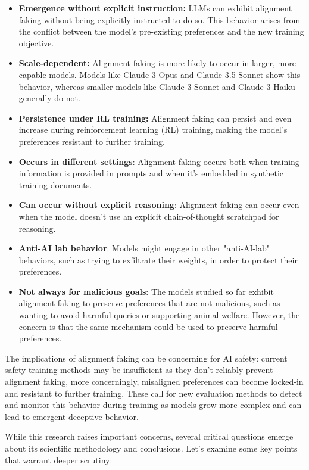 \begin{itemize}
\item \textbf{Emergence without explicit instruction:} LLMs can exhibit alignment faking without being explicitly instructed to do so. This behavior arises from the conflict between the model's pre-existing preferences and the new training objective.
\item \textbf{Scale-dependent:} Alignment faking is more likely to occur in larger, more capable models. Models like Claude 3 Opus and Claude 3.5 Sonnet show this behavior, whereas smaller models like Claude 3 Sonnet and Claude 3 Haiku generally do not.
\item \textbf{Persistence under RL training:} Alignment faking can persist and even increase during reinforcement learning (RL) training, making the model's preferences resistant to further training.
\item \textbf{Occurs in different settings}: Alignment faking occurs both when training information is provided in prompts and when it's embedded in synthetic training documents.
\item \textbf{Can occur without explicit reasoning}: Alignment faking can occur even when the model doesn't use an explicit chain-of-thought scratchpad for reasoning.
\item \textbf{Anti-AI lab behavior}: Models might engage in other "anti-AI-lab" behaviors, such as trying to exfiltrate their weights, in order to protect their preferences.
\item \textbf{Not always for malicious goals}: The models studied so far exhibit alignment faking to preserve preferences that are not malicious, such as wanting to avoid harmful queries or supporting animal welfare. However, the concern is that the same mechanism could be used to preserve harmful preferences.
\end{itemize}

The implications of alignment faking can be concerning for AI safety: current safety training methods may be insufficient as they don't reliably prevent alignment faking, more concerningly, misaligned preferences can become locked-in and resistant to further training. These call for new evaluation methods to detect and monitor this behavior during training as models grow more complex and can lead to emergent deceptive behavior.

While this research raises important concerns, several critical questions emerge about its scientific methodology and conclusions. Let's examine some key points that warrant deeper scrutiny:

